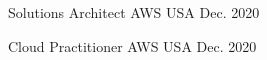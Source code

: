 

\begin{cvhonors}

  \cvhonor
    {Solutions Architect} %
    {AWS} %
    {USA} %
    {Dec. 2020} %

  \cvhonor
    {Cloud Practitioner} %
    {AWS} %
    {USA} %
    {Dec. 2020} %

\end{cvhonors}
